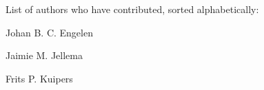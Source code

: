 List of authors who have contributed, sorted alphabetically\+:


\begin{DoxyItemize}
\item Johan B. C. Engelen
\item Jaimie M. Jellema
\item Frits P. Kuipers 
\end{DoxyItemize}
